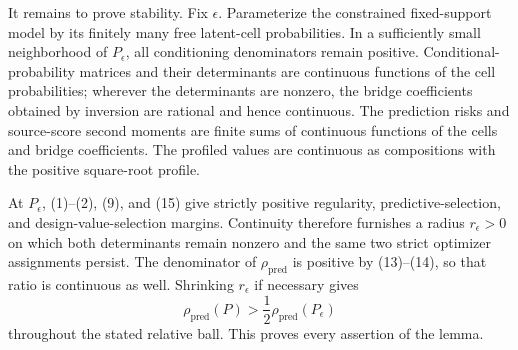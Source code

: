 It remains to prove stability.  Fix \(\epsilon\).  Parameterize the constrained fixed-support model by its finitely many free latent-cell probabilities.  In a sufficiently small neighborhood of \(P_\epsilon\), all conditioning denominators remain positive.  Conditional-probability matrices and their determinants are continuous functions of the cell probabilities; wherever the determinants are nonzero, the bridge coefficients obtained by inversion are rational and hence continuous.  The prediction risks and source-score second moments are finite sums of continuous functions of the cells and bridge coefficients.  The profiled values are continuous as compositions with the positive square-root profile.

At \(P_\epsilon\), (1)--(2), (9), and (15) give strictly positive regularity, predictive-selection, and design-value-selection margins.  Continuity therefore furnishes a radius \(r_\epsilon>0\) on which both determinants remain nonzero and the same two strict optimizer assignments persist.  The denominator of \(\rho_{\mathrm{pred}}\) is positive by (13)--(14), so that ratio is continuous as well.  Shrinking \(r_\epsilon\) if necessary gives
\[
 \rho_{\mathrm{pred}}(P)>\frac12\rho_{\mathrm{pred}}(P_\epsilon)
\]
throughout the stated relative ball.  This proves every assertion of the lemma.